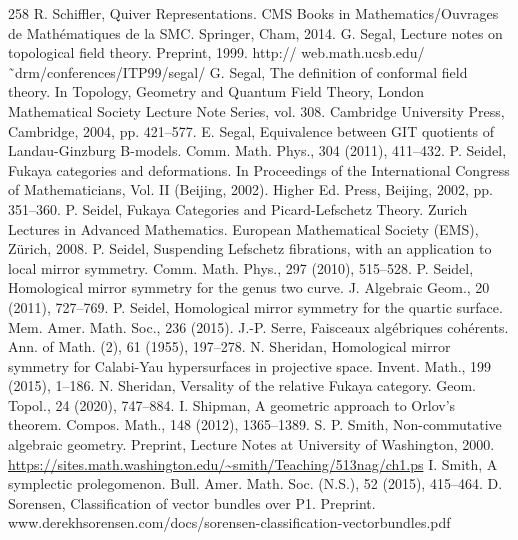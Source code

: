 \begin{thebibliography}{258}
\hypertarget{ref:213}{} R. Schiffler, Quiver Representations. CMS Books in Mathematics/Ouvrages de Mathématiques de la SMC. Springer, Cham, 2014.
\hypertarget{ref:214}{} G. Segal, Lecture notes on topological field theory. Preprint, 1999. http:// web.math.ucsb.edu/˜drm/conferences/ITP99/segal/
\hypertarget{ref:215}{} G. Segal, The definition of conformal field theory. In Topology, Geometry and Quantum Field Theory, London Mathematical Society Lecture Note Series, vol. 308. Cambridge University Press, Cambridge, 2004, pp. 421–577.
\hypertarget{ref:216}{} E. Segal, Equivalence between GIT quotients of Landau-Ginzburg B-models. Comm. Math. Phys., 304 (2011), 411–432.
\hypertarget{ref:217}{} P. Seidel, Fukaya categories and deformations. In Proceedings of the International Congress of Mathematicians, Vol. II (Beijing, 2002). Higher Ed. Press, Beijing, 2002, pp. 351–360.
\hypertarget{ref:218}{} P. Seidel, Fukaya Categories and Picard-Lefschetz Theory. Zurich Lectures in Advanced Mathematics. European Mathematical Society (EMS), Zürich, 2008.
\hypertarget{ref:219}{} P. Seidel, Suspending Lefschetz fibrations, with an application to local mirror symmetry. Comm. Math. Phys., 297 (2010), 515–528.
\hypertarget{ref:220}{} P. Seidel, Homological mirror symmetry for the genus two curve. J. Algebraic Geom., 20 (2011), 727–769.
\hypertarget{ref:221}{} P. Seidel, Homological mirror symmetry for the quartic surface. Mem. Amer. Math. Soc., 236 (2015).
\hypertarget{ref:222}{} J.-P. Serre, Faisceaux algébriques cohérents. Ann. of Math. (2), 61 (1955), 197–278.
\hypertarget{ref:223}{} N. Sheridan, Homological mirror symmetry for Calabi-Yau hypersurfaces in projective space. Invent. Math., 199 (2015), 1–186.
\hypertarget{ref:224}{} N. Sheridan, Versality of the relative Fukaya category. Geom. Topol., 24 (2020), 747–884.
\hypertarget{ref:225}{} I. Shipman, A geometric approach to Orlov’s theorem. Compos. Math., 148 (2012), 1365–1389.
\hypertarget{ref:226}{} S. P. Smith, Non-commutative algebraic geometry. Preprint, Lecture Notes at University of Washington, 2000. \url{https://sites.math.washington.edu/~smith/Teaching/513nag/ch1.ps}
\hypertarget{ref:227}{} I. Smith, A symplectic prolegomenon. Bull. Amer. Math. Soc. (N.S.), 52 (2015), 415–464.
\hypertarget{ref:228}{} D. Sorensen, Classification of vector bundles over P1. Preprint. www.derekhsorensen.com/docs/sorensen-classification-vectorbundles.pdf

\end{thebibliography}
